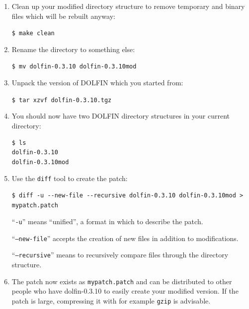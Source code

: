 \documentclass[12pt]{article}
\begin{document}
\begin{enumerate}
\item{

Clean up your modified directory structure to remove temporary and binary
files which will be rebuilt anyway:

\texttt{\$ make clean}
}
\item{

Rename the directory to something else:

\texttt{\$ mv dolfin-0.3.10 dolfin-0.3.10mod}
}
\item{

Unpack the version of DOLFIN which you started from:

\texttt{\$ tar xzvf dolfin-0.3.10.tgz}
}

\item{

You should now have two DOLFIN directory structures in your current directory:

\begin{verbatim}
$ ls
dolfin-0.3.10
dolfin-0.3.10mod
\end{verbatim}
}

\item{

Use the \texttt{diff} tool to create the patch:

\begin{verbatim}
$ diff -u --new-file --recursive dolfin-0.3.10 dolfin-0.3.10mod >
mypatch.patch
\end{verbatim}

``\texttt{-u}'' means ``unified'', a format in which to describe the patch.

``\texttt{--new-file}'' accepts the creation of new files in addition to modifications.

``\texttt{--recursive}'' means to recursively compare files through the
directory structure.


}
\item{

The patch now exists as \texttt{mypatch.patch} and can be distributed
to other people who have dolfin-0.3.10 to easily create your modified
version.  If the patch is large, compressing it with for example
\texttt{gzip} is advisable.

}

\end{enumerate}

\end{document}
